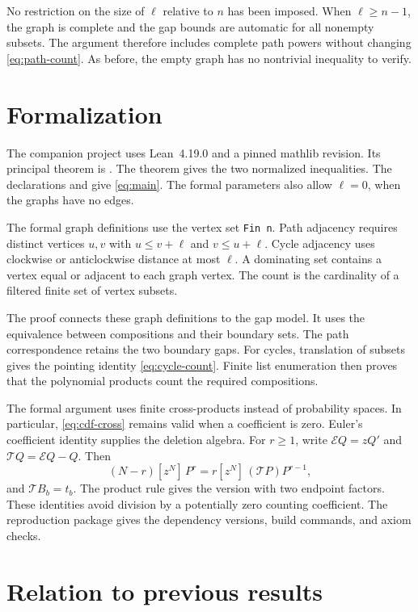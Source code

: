\documentclass[11pt]{article}
\theoremstyle{definition}
\theoremstyle{remark}
\newcommand{\coef}[2]{[z^{#1}]\,#2}
\begin{document}
No restriction on the size of $\ell$ relative to $n$ has been imposed.
When $\ell\geq n-1$, the graph is complete and the gap bounds are
automatic for all nonempty subsets. The argument therefore includes
complete path powers without changing \eqref{eq:path-count}. As before,
the empty graph has no nontrivial inequality to verify.

\section{Formalization}\label{sec:formal}

The companion project uses Lean~4.19.0 and a pinned mathlib revision. Its principal theorem is . The theorem  gives the two normalized inequalities. The declarations  and  give \eqref{eq:main}. The formal parameters also allow $\ell=0$, when the graphs have no edges.

The formal graph definitions use the vertex set \texttt{Fin n}. Path adjacency requires distinct vertices $u,v$ with $u\leq v+\ell$ and $v\leq u+\ell$. Cycle adjacency uses clockwise or anticlockwise distance at most $\ell$. A dominating set contains a vertex equal or adjacent to each graph vertex. The count is the cardinality of a filtered finite set of vertex subsets.

The proof connects these graph definitions to the gap model. It uses the equivalence between compositions and their boundary sets. The path correspondence retains the two boundary gaps. For cycles, translation of subsets gives the pointing identity \eqref{eq:cycle-count}. Finite list enumeration then proves that the polynomial products count the required compositions.

The formal argument uses finite cross-products instead of probability spaces. In particular, \eqref{eq:cdf-cross} remains valid when a coefficient is zero. Euler's coefficient identity supplies the deletion algebra. For $r\geq1$, write $\mathcal E Q=zQ'$ and $\mathcal TQ=\mathcal E Q-Q$. Then
\[
 (N-r)\coef{N}{P^r}
 =r\coef{N}{(\mathcal TP)P^{r-1}},
\]
and $\mathcal TB_b=t_b$. The product rule gives the version with two endpoint factors. These identities avoid division by a potentially zero counting coefficient. The reproduction package gives the dependency versions, build commands, and axiom checks.

\section{Relation to previous results}\label{sec:previous}
\end{document}
